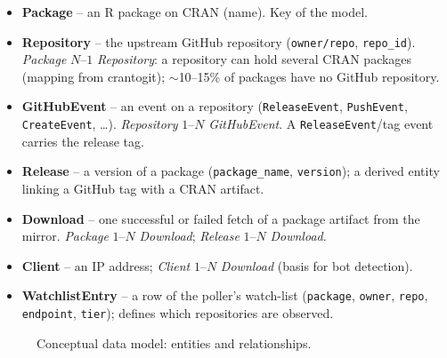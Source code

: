 \documentclass[11pt,a4paper]{article}
\begin{document}
\begin{itemize}
  \item \textbf{Package} -- an R package on CRAN (name). Key of the model.
  \item \textbf{Repository} -- the upstream GitHub repository (\texttt{owner/repo}, \texttt{repo\_\allowbreak{}id}).
        \emph{Package} $N$--$1$ \emph{Repository}: a repository can hold several CRAN packages (mapping from crantogit);
        $\sim$10--15\% of packages have no GitHub repository.
  \item \textbf{GitHubEvent} -- an event on a repository (\texttt{ReleaseEvent}, \texttt{PushEvent}, \texttt{CreateEvent}, \ldots).
        \emph{Repository} $1$--$N$ \emph{GitHubEvent}. A \texttt{ReleaseEvent}/tag event carries the release tag.
  \item \textbf{Release} -- a version of a package (\texttt{package\_\allowbreak{}name}, \texttt{version}); a derived entity
        linking a GitHub tag with a CRAN artifact.
  \item \textbf{Download} -- one successful or failed fetch of a package artifact from the mirror.
        \emph{Package} $1$--$N$ \emph{Download}; \emph{Release} $1$--$N$ \emph{Download}.
  \item \textbf{Client} -- an IP address; \emph{Client} $1$--$N$ \emph{Download} (basis for bot detection).
  \item \textbf{WatchlistEntry} -- a row of the poller's watch-list (\texttt{package}, \texttt{owner}, \texttt{repo},
        \texttt{endpoint}, \texttt{tier}); defines which repositories are observed.
\end{itemize}

\begin{figure}[H]
\centering
{}
\caption{Conceptual data model: entities and relationships.}
\label{fig:erd}
\end{figure}
\end{document}
